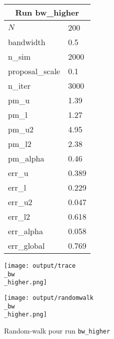 
\begin{figure}[H]
  \centering
  \begin{minipage}[t]{0.45\textwidth}
    \vspace{0pt}
    \footnotesize
    \begin{tabular}{|l|l|}\hline
    \multicolumn{2}{|c|}{\textbf{Run bw\_higher}} \\ \hline
    $N$ & 200 \\ \hline
    bandwidth & 0.5 \\ \hline
    n\_sim & 2000 \\ \hline
    proposal\_scale & 0.1 \\ \hline
    n\_iter & 3000 \\ \hline
    pm\_u & 1.39 \\ \hline
    pm\_l & 1.27 \\ \hline
    pm\_u2 & 4.95 \\ \hline
    pm\_l2 & 2.38 \\ \hline
    pm\_alpha & 0.46 \\ \hline
    err\_u & 0.389 \\ \hline
    err\_l & 0.229 \\ \hline
    err\_u2 & 0.047 \\ \hline
    err\_l2 & 0.618 \\ \hline
    err\_alpha & 0.058 \\ \hline
    err\_global & 0.769 \\ \hline
    \end{tabular}
  \end{minipage}
  \hfill
  \begin{minipage}[t]{0.45\textwidth}
    \vspace{0pt}
    \texttt{[image: output/trace\\\_bw\\\_higher.png]}
  \end{minipage}
\end{figure}

\begin{figure}[H]
  \centering
  \texttt{[image: output/randomwalk\\\_bw\\\_higher.png]}
  \caption{Random-walk pour run \texttt{bw\_higher}}
\end{figure}

